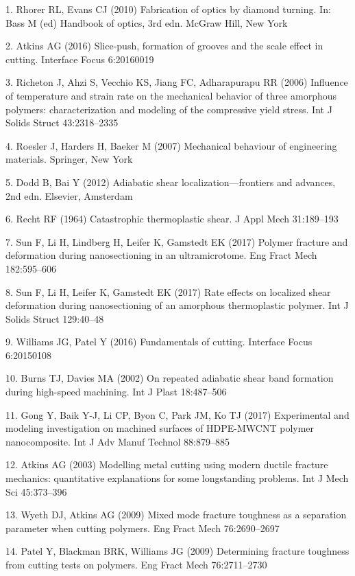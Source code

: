 \documentclass{article}
\begin{document}
\begin{hangpars}\small
1. Rhorer RL, Evans CJ (2010) Fabrication of optics by diamond turning. In: Bass M (ed) Handbook of optics, 3rd edn. McGraw Hill, New York

2. Atkins AG (2016) Slice-push, formation of grooves and the scale effect in cutting. Interface Focus 6:20160019

3. Richeton J, Ahzi S, Vecchio KS, Jiang FC, Adharapurapu RR (2006) Influence of temperature and strain rate on the mechanical behavior of three amorphous polymers: characterization and modeling of the compressive yield stress. Int J Solids Struct 43:2318–2335

4. Roesler J, Harders H, Baeker M (2007) Mechanical behaviour of engineering materials. Springer, New York

5. Dodd B, Bai Y (2012) Adiabatic shear localization—frontiers and advances, 2nd edn. Elsevier, Amsterdam

6. Recht RF (1964) Catastrophic thermoplastic shear. J Appl Mech 31:189–193

7. Sun F, Li H, Lindberg H, Leifer K, Gamstedt EK (2017) Polymer fracture and deformation during nanosectioning in an ultramicrotome. Eng Fract Mech 182:595–606

8. Sun F, Li H, Leifer K, Gamstedt EK (2017) Rate effects on localized shear deformation during nanosectioning of an amorphous thermoplastic polymer. Int J Solids Struct 129:40–48

9. Williams JG, Patel Y (2016) Fundamentals of cutting. Interface Focus 6:20150108

10. Burns TJ, Davies MA (2002) On repeated adiabatic shear band formation during high-speed machining. Int J Plast 18:487–506

11. Gong Y, Baik Y-J, Li CP, Byon C, Park JM, Ko TJ (2017) Experimental and modeling investigation on machined surfaces of HDPE-MWCNT polymer nanocomposite. Int J Adv Manuf Technol 88:879–885

12. Atkins AG (2003) Modelling metal cutting using modern ductile fracture mechanics: quantitative explanations for some longstanding problems. Int J Mech Sci 45:373–396

13. Wyeth DJ, Atkins AG (2009) Mixed mode fracture toughness as a separation parameter when cutting polymers. Eng Fract Mech 76:2690–2697

14. Patel Y, Blackman BRK, Williams JG (2009) Determining fracture toughness from cutting tests on polymers. Eng Fract Mech 76:2711–2730


\end{hangpars}
\end{document}
